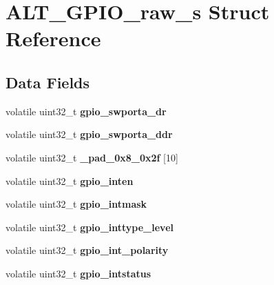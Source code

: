 \hypertarget{structALT__GPIO__raw__s}{}\section{A\+L\+T\+\_\+\+G\+P\+I\+O\+\_\+raw\+\_\+s Struct Reference}
\label{structALT__GPIO__raw__s}
\subsection*{Data Fields}
\begin{DoxyCompactItemize}
\item 
\mbox{\label{structALT__GPIO__raw__s_a7e2a2b2d5967fb707cfab433368705f6}} 
volatile uint32\+\_\+t {\bfseries gpio\+\_\+swporta\+\_\+dr}
\item 
\mbox{\label{structALT__GPIO__raw__s_a680c26b17b25d98a34ea461eb7131f4d}} 
volatile uint32\+\_\+t {\bfseries gpio\+\_\+swporta\+\_\+ddr}
\item 
\mbox{\label{structALT__GPIO__raw__s_aeba33864ba38ae69707de8eef5f2371d}} 
volatile uint32\+\_\+t {\bfseries \+\_\+pad\+\_\+0x8\+\_\+0x2f} \mbox{[}10\mbox{]}
\item 
\mbox{\label{structALT__GPIO__raw__s_a1743ea23c995d3d0b2144bc730834c41}} 
volatile uint32\+\_\+t {\bfseries gpio\+\_\+inten}
\item 
\mbox{\label{structALT__GPIO__raw__s_a306affc5ea50215eb68d69a113786672}} 
volatile uint32\+\_\+t {\bfseries gpio\+\_\+intmask}
\item 
\mbox{\label{structALT__GPIO__raw__s_a02d5636f940bce9a4a64810d1f2ad618}} 
volatile uint32\+\_\+t {\bfseries gpio\+\_\+inttype\+\_\+level}
\item 
\mbox{\label{structALT__GPIO__raw__s_ad591b3a56e28091a9414f17c6bd8f1aa}} 
volatile uint32\+\_\+t {\bfseries gpio\+\_\+int\+\_\+polarity}
\item 
\mbox{\label{structALT__GPIO__raw__s_aad38aac7c7900f8c37b35d68be552ba8}} 
volatile uint32\+\_\+t {\bfseries gpio\+\_\+intstatus}

\end{DoxyCompactItemize}
